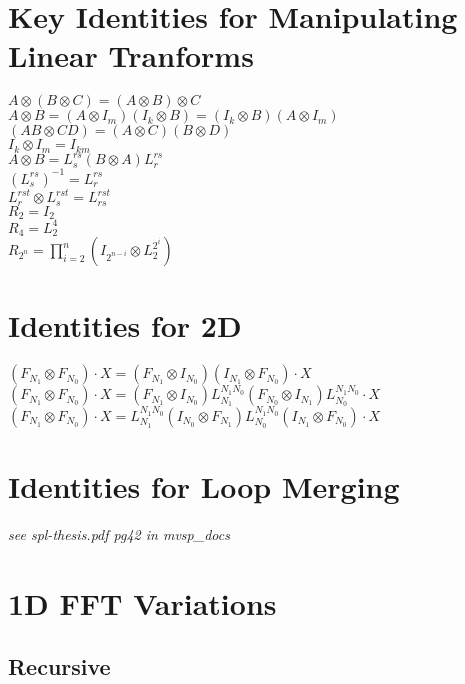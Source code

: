 \documentclass[11pt]{article}
\begin{document}
\section*{Key Identities for Manipulating Linear Tranforms}
$A\otimes (B\otimes C) = (A\otimes B)\otimes C$\\
$A\otimes B = (A\otimes I_{m})(I_{k}\otimes B) = (I_{k}\otimes B)(A\otimes I_{m})$\\
$(AB\otimes CD) = (A\otimes C)(B\otimes D)$\\
\newline
$I_{k}\otimes I_{m} = I_{km}$\\
$A\otimes B = L^{rs}_{s}(B\otimes A)L^{rs}_{r}$\\
\newline
$(L^{rs}_{s})^{-1} = L^{rs}_{r}$\\
$L^{rst}_{r}\otimes L^{rst}_{s} = L^{rst}_{rs}$\\
\newline
$R_{2} = I_{2}$\\
$R_{4} = L_{2}^{4}$\\
$R_{2^{n}} = \prod\limits^{n}_{i=2}(I_{2^{n-i}}\otimes L^{2^{i}}_{2})$\\

\section*{Identities for 2D}
$(F_{N_{1}}\otimes F_{N_{0}})\cdot X = (F_{N_{1}}\otimes I_{N_{0}})(I_{N_{1}}\otimes F_{N_{0}})\cdot X$\\ 
$(F_{N_{1}}\otimes F_{N_{0}})\cdot X = (F_{N_{1}}\otimes I_{N_{0}})L^{N_{1}N_{0}}_{N_{1}}(F_{N_{0}}\otimes I_{N_{1}})L^{N_{1}N_{0}}_{N_{0}}\cdot X$\\ 
$(F_{N_{1}}\otimes F_{N_{0}})\cdot X = L^{N_{1}N_{0}}_{N_{1}}(I_{N_{0}}\otimes F_{N_{1}})L^{N_{1}N_{0}}_{N_{0}}(I_{N_{1}}\otimes F_{N_{0}})\cdot X$\\ 

\section*{Identities for Loop Merging}
\emph{see spl-thesis.pdf pg42 in mvsp\_docs}


\newpage
\section*{1D FFT Variations}
\subsection*{Recursive}
\end{document}
